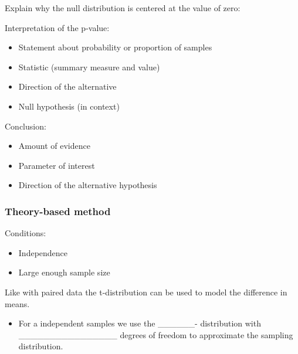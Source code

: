 \documentclass[
]{report}
\providecommand{\tightlist}{%
  \setlength{\itemsep}{0pt}\setlength{\parskip}{0pt}}
\begin{document}
Explain why the null distribution is centered at the value of zero:

\newpage

Interpretation of the p-value:

\begin{itemize}
\item
  Statement about probability or proportion of samples
\item
  Statistic (summary measure and value)
\item
  Direction of the alternative
\item
  Null hypothesis (in context)
\end{itemize}

\vspace{0.8in}

Conclusion:

\begin{itemize}
\item
  Amount of evidence
\item
  Parameter of interest
\item
  Direction of the alternative hypothesis
\end{itemize}

\vspace{0.6in}

\hypertarget{theory-based-method-4}{%
\subsubsection*{Theory-based method}\label{theory-based-method-4}}

Conditions:

\begin{itemize}
\item
  Independence
\item
  Large enough sample size
\end{itemize}

\vspace{1in}

Like with paired data the t-distribution can be used to model the difference in means.


\begin{itemize}
\tightlist
\item
  For a independent samples we use the \_\_\_\_\_\_- distribution
  with \_\_\_\_\_\_\_\_\_\_\_\_\_\_\_\_ degrees of freedom to approximate the sampling distribution.
\end{itemize}
\end{document}
